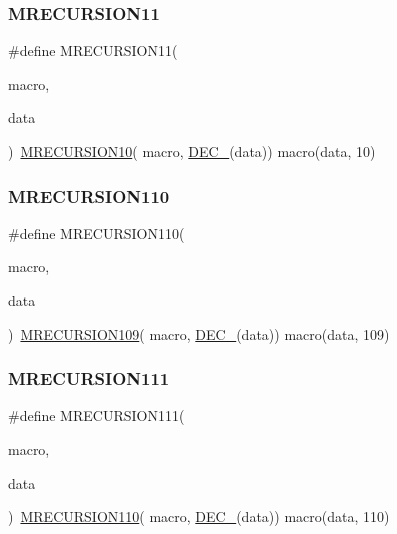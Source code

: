 \subsubsection{\texorpdfstring{MRECURSION11}{MRECURSION11}}
{\footnotesize\ttfamily \#define M\+R\+E\+C\+U\+R\+S\+I\+O\+N11(\begin{DoxyParamCaption}\item[{}]{macro,  }\item[{}]{data }\end{DoxyParamCaption})~\mbox{\hyperlink{group__group__sam0__utils__mrecursion_ga3700eed97ae48ef8cbc22f11f4dbc78d}{M\+R\+E\+C\+U\+R\+S\+I\+O\+N10}}(  macro, \mbox{\hyperlink{group__group__sam0__utils__mrecursion_ga1d23d683797679dca8c3512a54a5dcae}{D\+E\+C\+\_\+}}(data))   macro(data, 10)}

\mbox{\label{group__group__sam0__utils__mrecursion_ga6e8affd87de0ca5058d3864a21b71971}} 
\subsubsection{\texorpdfstring{MRECURSION110}{MRECURSION110}}
{\footnotesize\ttfamily \#define M\+R\+E\+C\+U\+R\+S\+I\+O\+N110(\begin{DoxyParamCaption}\item[{}]{macro,  }\item[{}]{data }\end{DoxyParamCaption})~\mbox{\hyperlink{group__group__sam0__utils__mrecursion_ga1f65b89088c75778a8e1a57272204963}{M\+R\+E\+C\+U\+R\+S\+I\+O\+N109}}(  macro, \mbox{\hyperlink{group__group__sam0__utils__mrecursion_ga1d23d683797679dca8c3512a54a5dcae}{D\+E\+C\+\_\+}}(data))   macro(data, 109)}

\mbox{\label{group__group__sam0__utils__mrecursion_ga356438994d8a464952aacd98495045a3}} 
\subsubsection{\texorpdfstring{MRECURSION111}{MRECURSION111}}
{\footnotesize\ttfamily \#define M\+R\+E\+C\+U\+R\+S\+I\+O\+N111(\begin{DoxyParamCaption}\item[{}]{macro,  }\item[{}]{data }\end{DoxyParamCaption})~\mbox{\hyperlink{group__group__sam0__utils__mrecursion_ga6e8affd87de0ca5058d3864a21b71971}{M\+R\+E\+C\+U\+R\+S\+I\+O\+N110}}(  macro, \mbox{\hyperlink{group__group__sam0__utils__mrecursion_ga1d23d683797679dca8c3512a54a5dcae}{D\+E\+C\+\_\+}}(data))   macro(data, 110)}

